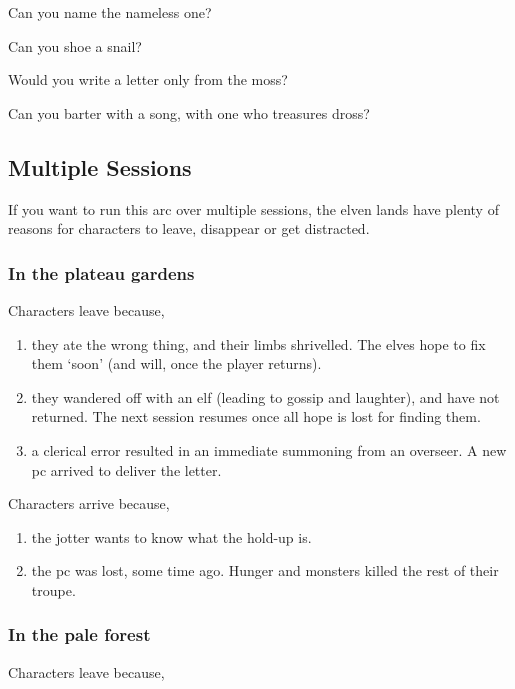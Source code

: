 \begin{exampletext}
  Can you name the nameless one?

  Can you shoe a snail?

  Would you write a letter only from the moss?

  Can you barter with a song, with one who treasures dross?
\end{exampletext}

\subsection{Multiple Sessions}

If you want to run this arc over multiple sessions, the elven lands have plenty of reasons for characters to leave, disappear or get distracted.

\subsubsection{In the plateau gardens}

Characters leave because,


\begin{enumerate}
  \item
  they ate the wrong thing, and their limbs shrivelled.
  The elves hope to fix them `soon' (and will, once the player returns).
  \item
  they wandered off with an elf (leading to gossip and laughter), and have not returned.
  The next session resumes once all hope is lost for finding them.
  \item
  a clerical error resulted in an immediate summoning from an overseer.
  A new \gls{pc} arrived to deliver the letter.
\end{enumerate}

Characters arrive because,

\begin{enumerate}
  \item
  the \gls{jotter} wants to know what the hold-up is.
  \item
  the \gls{pc} was lost, some time ago.
  Hunger and monsters killed the rest of their troupe.
\end{enumerate}

\subsubsection{In the pale forest}

Characters leave because,

